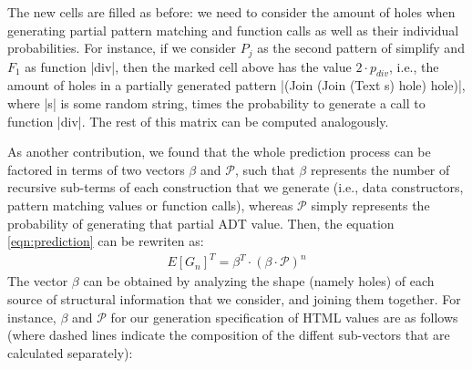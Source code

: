 The new cells are filled as before: we need to consider the amount of holes when
generating partial pattern matching and function calls as well as their
individual probabilities.
%
%
For instance, if we consider $P_j$ as the second pattern of simplify and $F_1$
as function |div|, then the marked cell above has the value $2\cdot p_{div}$,
i.e., the amount of holes in a partially generated pattern |(Join (Join (Text s)
hole) hole)|, where |s| is some random string, times the probability to generate
a call to function |div|.
%
The rest of this matrix can be computed analogously.

%

As another contribution, we found that the whole prediction process can be
factored in terms of two vectors $\beta$ and $\mathcal{P}$, such that $\beta$
represents the number of recursive sub-terms of each construction that we
generate (i.e., data constructors, pattern matching values or function calls),
whereas $\mathcal{P}$ simply represents the probability of generating that
partial ADT value.%
%
Then, the equation \ref{eqn:prediction} can be rewriten as:
%
\begin{align*}
  E[G_n]^T = \beta^T \cdot (\beta \cdot \mathcal{P})^{n}
\end{align*}
%
The vector $\beta$ can be obtained by analyzing the shape (namely holes) of each
source of structural information that we consider, and joining them together.
%
For instance, $\beta$ and $\mathcal{P}$ for our generation specification of HTML
values are as follows (where dashed lines indicate the composition of the
diffent sub-vectors that are calculated separately):

